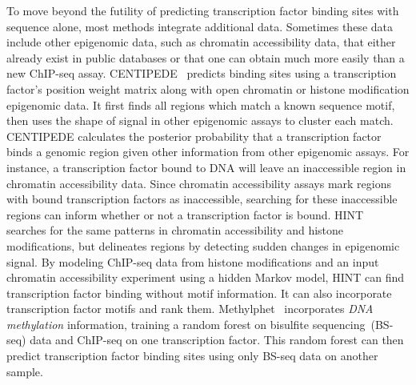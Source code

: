 \documentclass[5p]{elsarticle}
\newcommand{\rev}[1]{{\color{black}#1}}
\begin{document}
To move beyond the futility of predicting transcription factor binding sites with sequence alone, most methods integrate additional data.
Sometimes these data include other epigenomic data, such as chromatin accessibility data, that either already exist in public databases or that one can obtain much more easily than a new ChIP-seq assay.
CENTIPEDE~\cite{Pique-Regi2011AccurateData} predicts binding sites using a transcription factor's position weight matrix along with open chromatin or histone modification epigenomic data.
It first finds all regions which match a known sequence motif, then uses the shape of signal in other epigenomic assays to cluster each match.
CENTIPEDE calculates the posterior probability that a transcription factor binds a genomic region given other information from other epigenomic assays.
For instance, a transcription factor bound to DNA will leave an inaccessible region in chromatin accessibility data.
Since chromatin accessibility assays mark regions with bound transcription factors as inaccessible, searching for these inaccessible regions can inform whether or not a transcription factor is bound.
HINT~\cite{Gusmao2014DetectionModifications} searches for the same patterns in chromatin accessibility and histone modifications, but delineates regions by detecting sudden changes in epigenomic signal.
By modeling ChIP-seq data from histone modifications and an input chromatin accessibility experiment using a hidden Markov model, HINT can \rev{find} transcription factor binding without motif information.
It can also incorporate transcription factor motifs and rank them.
Methylphet~\cite{Xu2015Base-resolutionVivo} incorporates \emph{DNA methylation} information, training a random forest on bisulfite sequencing~(BS-seq) data and ChIP-seq on one transcription factor.
This random forest can then predict transcription factor binding sites using only BS-seq data on another sample.
\end{document}
